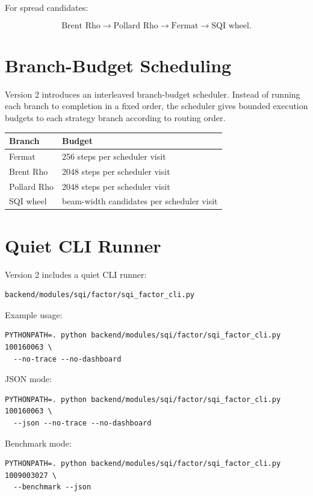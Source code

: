 \documentclass[11pt,a4paper]{article}
\begin{document}
For spread candidates:

\[
\text{Brent Rho}
\rightarrow
\text{Pollard Rho}
\rightarrow
\text{Fermat}
\rightarrow
\text{SQI wheel}.
\]

\section{Branch-Budget Scheduling}

Version 2 introduces an interleaved branch-budget scheduler. Instead of running each branch
to completion in a fixed order, the scheduler gives bounded execution budgets to each
strategy branch according to routing order.

\begin{tabularx}{\textwidth}{@{}lX@{}}
\textbf{Branch} & \textbf{Budget} \\
\hline
Fermat & 256 steps per scheduler visit \\
Brent Rho & 2048 steps per scheduler visit \\
Pollard Rho & 2048 steps per scheduler visit \\
SQI wheel & beam-width candidates per scheduler visit \\
\end{tabularx}

\section{Quiet CLI Runner}

Version 2 includes a quiet CLI runner:

\begin{verbatim}
backend/modules/sqi/factor/sqi_factor_cli.py
\end{verbatim}

Example usage:

\begin{verbatim}
PYTHONPATH=. python backend/modules/sqi/factor/sqi_factor_cli.py 100160063 \
  --no-trace --no-dashboard
\end{verbatim}

JSON mode:

\begin{verbatim}
PYTHONPATH=. python backend/modules/sqi/factor/sqi_factor_cli.py 100160063 \
  --json --no-trace --no-dashboard
\end{verbatim}

Benchmark mode:

\begin{verbatim}
PYTHONPATH=. python backend/modules/sqi/factor/sqi_factor_cli.py 1009003027 \
  --benchmark --json
\end{verbatim}
\end{document}
